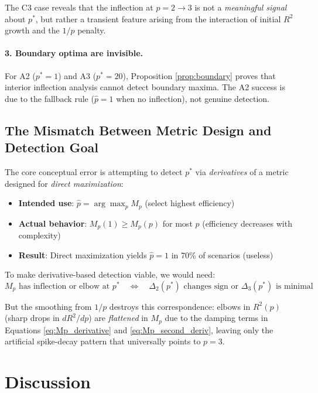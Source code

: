\documentclass[11pt,a4paper]{article}
\begin{document}
The C3 case reveals that the inflection at $p = 2 \to 3$ is not a \emph{meaningful signal} about $p^*$, but rather a transient feature arising from the interaction of initial $R^2$ growth and the $1/p$ penalty.

\paragraph{3. Boundary optima are invisible.}
For A2 ($p^* = 1$) and A3 ($p^* = 20$), Proposition \ref{prop:boundary} proves that interior inflection analysis cannot detect boundary maxima. The A2 success is due to the fallback rule ($\hat{p} = 1$ when no inflection), not genuine detection.

\subsection{The Mismatch Between Metric Design and Detection Goal}

The core conceptual error is attempting to detect $p^*$ via \emph{derivatives} of a metric designed for \emph{direct maximization}:

\begin{itemize}
\item \textbf{Intended use}: $\hat{p} = \arg\max_p M_p$ (select highest efficiency)
\item \textbf{Actual behavior}: $M_p(1) \geq M_p(p)$ for most $p$ (efficiency decreases with complexity)
\item \textbf{Result}: Direct maximization yields $\hat{p} = 1$ in 70\% of scenarios (useless)
\end{itemize}

To make derivative-based detection viable, we would need:
\begin{equation}
M_p \text{ has inflection or elbow at } p^* \quad \Leftrightarrow \quad \Delta_2(p^*) \text{ changes sign or } \Delta_3(p^*) \text{ is minimal}
\end{equation}

But the smoothing from $1/p$ destroys this correspondence: elbows in $R^2(p)$ (sharp drops in $dR^2/dp$) are \emph{flattened} in $M_p$ due to the damping terms in Equations \eqref{eq:Mp_derivative} and \eqref{eq:Mp_second_deriv}, leaving only the artificial spike-decay pattern that universally points to $p = 3$.

\section{Discussion}
\end{document}
